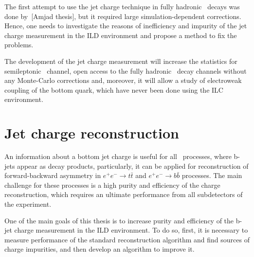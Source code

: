The first attempt to use the jet charge technique in fully hadronic \ttbar\ decays was done by~[Amjad thesis], but it required large simulation-dependent corrections. 
Hence, one needs to investigate the reasons of inefficiency and impurity of the jet charge measurement in the ILD environment and propose a method to fix the problems. 



The development of the jet charge measurement will increase the statistics for semileptonic \ttbar\ channel,  open access to the fully hadronic \ttbar\ decay channels without any Monte-Carlo corrections and, moreover, it will allow a study of electroweak coupling of the bottom quark, which have never been done using the ILC environment. 




\section{Jet charge reconstruction}
\label{sec:JetChargeReconstruction}
An information about a bottom jet charge is useful for all \sm\ processes, where b-jets appear as decay products, particularly, it can be applied for reconstruction of forward-backward asymmetry in $e^+e^-\to t\bar{t}$ and $e^+e^- \to b\bar{b}$ processes. 
The main challenge for these processes is a high purity and efficiency of the charge reconstruction, which requires an ultimate performance from all subdetectors of the experiment. 

One of the main goals of this thesis is to increase purity and efficiency of the b-jet charge measurement in the ILD environment. 
To do so, first, it is necessary to measure performance of the standard reconstruction algorithm and find sources of charge impurities, and then develop an algorithm to improve it. 



